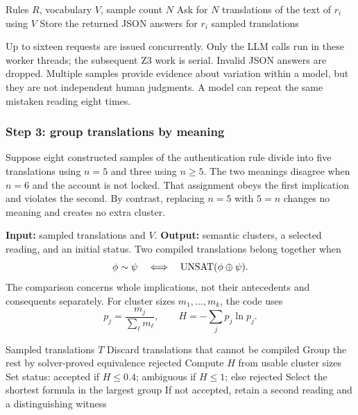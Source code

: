 \begin{algorithm}[H]
\caption{Sample translations in a fixed vocabulary}\label{alg:sample}
\begin{algorithmic}[1]
\Require Rules $R$, vocabulary $V$, sample count $N$
  \State Ask for $N$ translations of the text of $r_i$ using $V$
  \State Store the returned JSON answers for $r_i$
\EndFor
\State \Return sampled translations
\end{algorithmic}
\end{algorithm}

Up to sixteen requests are issued concurrently. Only the LLM calls run in
these worker threads; the subsequent Z3 work is serial. Invalid JSON
answers are dropped. Multiple samples provide evidence about variation
within a model, but they are not independent human judgments. A model can
repeat the same mistaken reading eight times.

\subsubsection{Step 3: group translations by meaning}
Suppose eight constructed samples of the authentication rule divide into
five translations using $n=5$ and three using $n\ge5$. The two meanings
disagree when $n=6$ and the account is not locked. That assignment obeys
the first implication and violates the second. By contrast, replacing
$n=5$ with $5=n$ changes no meaning and creates no extra cluster.

\textbf{Input:} sampled translations and $V$.
\textbf{Output:} semantic clusters, a selected reading, and an initial
status. Two compiled translations belong together when
\[
 \phi\sim\psi
 \quad\Longleftrightarrow\quad
 \operatorname{UNSAT}(\phi\mathbin{\oplus}\psi).
\]
The comparison concerns whole implications, not their antecedents and
consequents separately. For cluster sizes $m_1,\ldots,m_k$, the code uses
\[
 p_j=\frac{m_j}{\sum_\ell m_\ell},\qquad
 H=-\sum_j p_j\ln p_j.
\]

\begin{algorithm}[H]
\caption{Cluster and choose an initial reading}\label{alg:cluster}
\begin{algorithmic}[1]
\Require Sampled translations $T$
\State Discard translations that cannot be compiled
\State Group the rest by solver-proved equivalence
 \State \Return rejected \EndIf
\State Compute $H$ from usable cluster sizes
\State Set status: accepted if $H\le0.4$; ambiguous if $H\le1$; else rejected
\State Select the shortest formula in the largest group
\State If not accepted, retain a second reading and a distinguishing witness
\end{algorithmic}
\end{algorithm}

